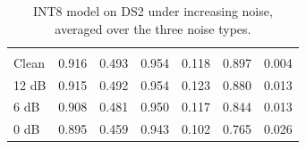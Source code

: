 \begin{table}[H]
  \centering
  \caption{INT8 model on DS2 under increasing noise, averaged over the three noise types.}
  \label{tab:noise}
  \begin{tabularx}{\linewidth}{lRRRRRR}
     &  &  &  &  &  &  \\
    Clean & 0.916 & 0.493 & 0.954 & 0.118 & 0.897 & 0.004 \\
    12 dB & 0.915 & 0.492 & 0.954 & 0.123 & 0.880 & 0.013 \\
    6 dB & 0.908 & 0.481 & 0.950 & 0.117 & 0.844 & 0.013 \\
    0 dB & 0.895 & 0.459 & 0.943 & 0.102 & 0.765 & 0.026 \\
    \bottomrule
  \end{tabularx}
\end{table}
